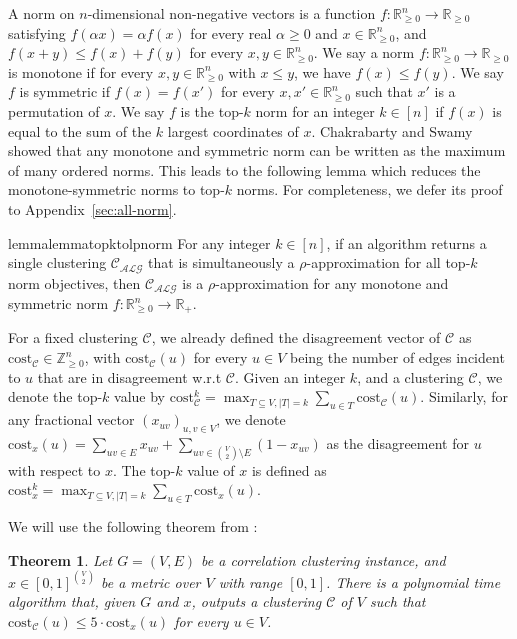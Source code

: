 \documentclass[11pt]{article}
\newcommand{\R}{\mathbb{R}}
\newcommand{\cost}{\mathrm{cost}}
\newtheorem{theorem}{Theorem}[section]
\newcommand{\calC}{{\mathcal{C}}}
\begin{document}
\begin{CJK*}{UTF8}{gbsn}
A norm on $n$-dimensional non-negative vectors is a function $f:\R_{\geq 0}^n \to \R_{\geq 0}$ satisfying $f(\alpha x) = \alpha f(x)$ for every real $\alpha \geq 0$ and $x \in \R_{\geq 0}^n$, and $f(x + y) \leq f(x) + f(y)$ for every $x, y \in \R_{\geq 0}^n$. We say a norm $f:\R_{\geq 0}^n \to \R_{\geq 0}$ is monotone if for every $x, y \in \R_{\geq 0}^n$ with $x \leq y$, we have $f(x) \leq f(y)$. We say $f$ is symmetric if $f(x) = f(x')$ for every $x, x' \in \R_{\geq 0}^n$ such that $x'$ is a permutation of $x$.
We say $f$ is the top-$k$ norm for an integer $k \in [n]$ if $f(x)$ is equal to the sum of the $k$ largest coordinates of $x$.
 Chakrabarty and Swamy \cite{chakrabarty2019approximation} showed that any monotone and symmetric norm can be written as the maximum of many ordered norms.  This leads to the following lemma which reduces the monotone-symmetric norms to top-$k$ norms. For completeness, we defer its proof to Appendix~\ref{sec:all-norm}. 
\begin{restatable}{lemma}{lemmatopktolpnorm}
\label{lem:Topk2all}
    For any integer $k\in [n]$, if an algorithm returns a single clustering $\mathcal{C_{\text{ALG}}}$ that is simultaneously a $\rho$-approximation for all top-$k$ norm objectives, then $\mathcal{C_{\text{ALG}}}$ is a $\rho$-approximation for any monotone and symmetric norm $f:\mathbb{R}^n_{\geq 0} \rightarrow \mathbb{R}_+$.
\end{restatable}

For a fixed clustering $\mathcal{C}$, we already defined the disagreement vector of $\mathcal{C}$ as $\cost_\mathcal{C} \in \mathbb{Z}_{\ge 0}^n$, with $\cost_\mathcal{C}(u)$ for every $u \in V$ being the number of edges incident to $u$ that are in disagreement w.r.t $\mathcal{C}$.
Given an integer $k$, and a clustering $\mathcal{C}$, we denote the top-$k$ value by $\cost^k_\calC = \max_{T \subseteq V, |T| = k} \sum_{u \in T} \cost_\calC(u)$. Similarly, for any fractional vector $(x_{uv})_{u, v \in V}$,  we denote $\cost_{x}(u) = \sum_{uv \in E} x_{uv} + \sum_{uv \in {V \choose 2} \setminus E}(1 - x_{uv})$ as the disagreement for $u$ with respect to $x$. The top-$k$ value of $x$ is defined as $\cost^k_x  = \max_{T \subseteq V, |T| = k} \sum_{u \in T} \cost_x(u)$.
\medskip

We will use the following theorem from \cite{kalhan2019correlation}:
\begin{theorem}
    \label{thm:KMZ}
    Let $G = (V, E)$ be a correlation clustering instance, and $x \in [0, 1]^{{V \choose 2}}$ be a metric over $V$ with range $[0, 1]$.  There is a polynomial time algorithm that, given $G$ and $x$, outputs a clustering $\calC$ of $V$ such that $\cost_{\calC}(u) \leq 5\cdot \cost_x(u)$ for every $u \in V$. 
\end{theorem}




\end{CJK*}
\end{document}
